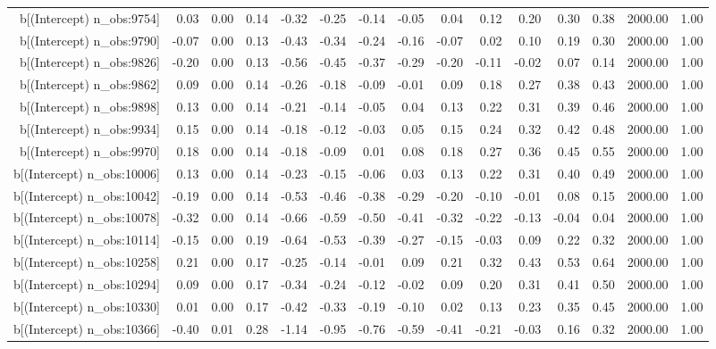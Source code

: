 \begin{table}[ht]
\begin{tabular}{rrrrrrrrrrrrrrr}
  b[(Intercept) n\_obs:9754] & 0.03 & 0.00 & 0.14 & -0.32 & -0.25 & -0.14 & -0.05 & 0.04 & 0.12 & 0.20 & 0.30 & 0.38 & 2000.00 & 1.00 \\ 
  b[(Intercept) n\_obs:9790] & -0.07 & 0.00 & 0.13 & -0.43 & -0.34 & -0.24 & -0.16 & -0.07 & 0.02 & 0.10 & 0.19 & 0.30 & 2000.00 & 1.00 \\ 
  b[(Intercept) n\_obs:9826] & -0.20 & 0.00 & 0.13 & -0.56 & -0.45 & -0.37 & -0.29 & -0.20 & -0.11 & -0.02 & 0.07 & 0.14 & 2000.00 & 1.00 \\ 
  b[(Intercept) n\_obs:9862] & 0.09 & 0.00 & 0.14 & -0.26 & -0.18 & -0.09 & -0.01 & 0.09 & 0.18 & 0.27 & 0.38 & 0.43 & 2000.00 & 1.00 \\ 
  b[(Intercept) n\_obs:9898] & 0.13 & 0.00 & 0.14 & -0.21 & -0.14 & -0.05 & 0.04 & 0.13 & 0.22 & 0.31 & 0.39 & 0.46 & 2000.00 & 1.00 \\ 
  b[(Intercept) n\_obs:9934] & 0.15 & 0.00 & 0.14 & -0.18 & -0.12 & -0.03 & 0.05 & 0.15 & 0.24 & 0.32 & 0.42 & 0.48 & 2000.00 & 1.00 \\ 
  b[(Intercept) n\_obs:9970] & 0.18 & 0.00 & 0.14 & -0.18 & -0.09 & 0.01 & 0.08 & 0.18 & 0.27 & 0.36 & 0.45 & 0.55 & 2000.00 & 1.00 \\ 
  b[(Intercept) n\_obs:10006] & 0.13 & 0.00 & 0.14 & -0.23 & -0.15 & -0.06 & 0.03 & 0.13 & 0.22 & 0.31 & 0.40 & 0.49 & 2000.00 & 1.00 \\ 
  b[(Intercept) n\_obs:10042] & -0.19 & 0.00 & 0.14 & -0.53 & -0.46 & -0.38 & -0.29 & -0.20 & -0.10 & -0.01 & 0.08 & 0.15 & 2000.00 & 1.00 \\ 
  b[(Intercept) n\_obs:10078] & -0.32 & 0.00 & 0.14 & -0.66 & -0.59 & -0.50 & -0.41 & -0.32 & -0.22 & -0.13 & -0.04 & 0.04 & 2000.00 & 1.00 \\ 
  b[(Intercept) n\_obs:10114] & -0.15 & 0.00 & 0.19 & -0.64 & -0.53 & -0.39 & -0.27 & -0.15 & -0.03 & 0.09 & 0.22 & 0.32 & 2000.00 & 1.00 \\ 
  b[(Intercept) n\_obs:10258] & 0.21 & 0.00 & 0.17 & -0.25 & -0.14 & -0.01 & 0.09 & 0.21 & 0.32 & 0.43 & 0.53 & 0.64 & 2000.00 & 1.00 \\ 
  b[(Intercept) n\_obs:10294] & 0.09 & 0.00 & 0.17 & -0.34 & -0.24 & -0.12 & -0.02 & 0.09 & 0.20 & 0.31 & 0.41 & 0.50 & 2000.00 & 1.00 \\ 
  b[(Intercept) n\_obs:10330] & 0.01 & 0.00 & 0.17 & -0.42 & -0.33 & -0.19 & -0.10 & 0.02 & 0.13 & 0.23 & 0.35 & 0.45 & 2000.00 & 1.00 \\ 
  b[(Intercept) n\_obs:10366] & -0.40 & 0.01 & 0.28 & -1.14 & -0.95 & -0.76 & -0.59 & -0.41 & -0.21 & -0.03 & 0.16 & 0.32 & 2000.00 & 1.00 \\ 

\end{tabular}
\end{table}
